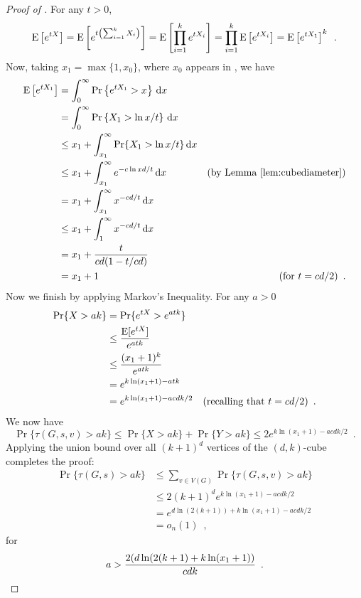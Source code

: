 \documentclass{patmorin}
\begin{document}
\begin{proof}[Proof of ]
For any $t>0$,
\[
    \mathrm{E}\left[e^{tX}\right] 
      = \mathrm{E}\left[e^{t\left(\sum_{i=1}^k X_i\right)}\right] 
      = \mathrm{E}\left[\prod_{i=1}^k e^{tX_i}\right]
      = \prod_{i=1}^k\mathrm{E}\left[e^{tX_i}\right]
      = \mathrm{E}\left[e^{tX_1}\right]^k \enspace .
\]
Now, taking $x_1=\max\{1,x_0\}$, where $x_0$ appears in , 
we have
\begin{align*}
   \E\left[e^{tX_1}\right]
     & = \int_0^\infty \Pr\left\{e^{tX_1} > x\right\}\,\mathrm{d}x \\
     & = \int_0^\infty \Pr\left\{X_1 > \ln x/t\right\}\,\mathrm{d}x \\
     & \le x_1 + \int_{x_1}^\infty \Pr\{X_1 > \ln x/t\}\,\mathrm{d}x \\
     & \le x_1 + \int_{x_1}^\infty e^{-c\ln x d/t}\,\mathrm{d}x & \text{(by \lemref{cubediameter})} \\
     & =  x_1 + \int_{x_1}^\infty x^{-cd/t}\,\mathrm{d}x \\
     & \le  x_1 + \int_{1}^\infty x^{-cd/t}\,\mathrm{d}x \\
     & = x_1 + \frac{t}{cd(1-t/cd)} \\
     & = x_1 + 1 & \text{(for $t=cd/2$)} \enspace .
\end{align*}
Now we finish by applying Markov's Inequality.  For any $a>0$
\begin{align*}
   \Pr\{X > ak \} 
    &= \Pr\{ e^{tX} > e^{atk}\} \\
    &\le \frac{\mathrm{E}[e^{tX}]}{e^{atk}} \\
    &\le \frac{(x_1+1)^k}{e^{atk}} \\
    &= e^{k\ln(x_1+1) - atk} \\
    &= e^{k\ln(x_1+1) - acdk/2} &\text{(recalling that $t=cd/2$)} \enspace .
\end{align*}
We now have
\[
   \Pr\{ \tau(G,s,v) > ak\} \le \Pr\{X > ak\} + \Pr\{Y>ak\}
          \le 2 e^{k\ln(x_1+1) - acdk/2} \enspace .
\]
Applying the union bound over all $(k+1)^d$ vertices of the $(d,k)$-cube
completes the proof:
\begin{align*}
   \Pr\{\tau(G,s) > ak\} 
     & \le \sum_{v\in V(G)} \Pr\{ \tau(G,s,v) > ak\}  \\
     & \le 2(k+1)^d e^{k\ln(x_1+1) - acdk/2} \\
     & = e^{d\ln(2(k+1))+k\ln(x_1+1) - acdk/2} \\
     & = o_n(1) \enspace ,
\end{align*}
for
\[
   a > \frac{2(d\ln(2(k+1)+k\ln(x_1+1))}{cdk} \enspace .
\qedhere 
\]




\end{proof}
\end{document}
